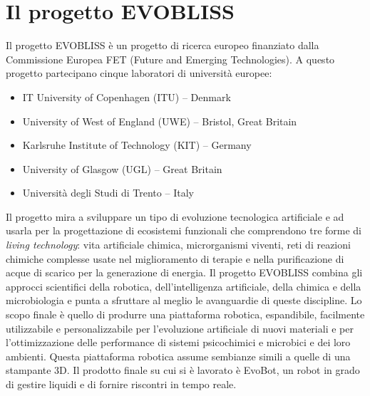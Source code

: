 \section{Il progetto EVOBLISS}
\label{sec:context}
Il progetto EVOBLISS  è un progetto di ricerca europeo finanziato dalla Commissione Europea FET (Future and Emerging Technologies). A questo progetto partecipano cinque laboratori di università europee:
\begin{itemize}
\item IT University of Copenhagen (ITU) – Denmark
\item University of West of England (UWE) – Bristol, Great Britain
\item Karlsruhe Institute of Technology (KIT) – Germany
\item University of Glasgow (UGL) – Great Britain
\item Università degli Studi di Trento – Italy
\end{itemize}
Il progetto mira a sviluppare un tipo di evoluzione tecnologica artificiale e ad usarla per la progettazione di ecosistemi funzionali che comprendono tre forme di \emph{living technology}: vita artificiale chimica, microrganismi viventi, reti di reazioni chimiche complesse usate nel miglioramento di terapie e nella purificazione di acque di scarico per la generazione di energia.
Il progetto EVOBLISS combina gli approcci scientifici della robotica, dell'intelligenza artificiale, della chimica e della microbiologia e punta a sfruttare al meglio le avanguardie di queste discipline. Lo scopo finale è quello di produrre una piattaforma robotica, espandibile, facilmente utilizzabile e personalizzabile per l'evoluzione artificiale di nuovi materiali e per l'ottimizzazione delle performance di sistemi psicochimici e microbici e dei loro ambienti. 
Questa piattaforma robotica assume sembianze simili a quelle di una stampante 3D. Il prodotto finale su cui si è lavorato è EvoBot, un robot in grado di gestire liquidi e di fornire riscontri in tempo reale. 

